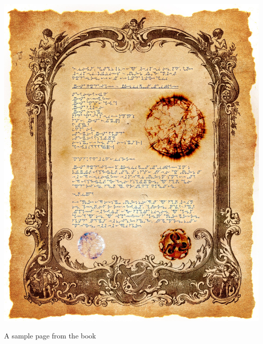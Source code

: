 \documentclass[11pt]{article}
\begin{document}
\begin{center}
	\includegraphics[]{./page.jpg}
	
	{\footnotesize A sample page from the book}
\end{center}
\end{document}
